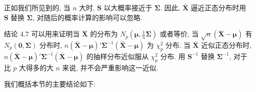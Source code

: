 正如我们所见到的, 当 $n$ 大时, $\mathbf{S}$ 以大概率接近于 $\boldsymbol{\Sigma}$. 因此, $\bar{\mathbf{X}}$ 逼近正态分布时用 $\mathbf{S}$ 替换 $\boldsymbol{\Sigma}$, 对随后的概率计算的影响可以忽略.

结论 4.7 可以用来证明当 $\bar{\mathbf{X}}$ 的分布为 $N_{p}\left(\boldsymbol{\mu},\frac{1}{n}\boldsymbol{\Sigma}\right)$ 或者等价, 当 $\sqrt{n}(\bar{\mathbf{X}}-\boldsymbol{\mu})$ 有 $N_{p}(\mathbf{0},\boldsymbol{\Sigma})$ 分布时, $n(\bar{\mathbf{X}}-\boldsymbol{\mu})'\boldsymbol{\Sigma}^{-1}(\bar{\mathbf{X}}-\boldsymbol{\mu})$ 为 $\chi_{p}^{2}$ 分布. 当 $\bar{\mathbf{X}}$ 近似正态分布时, $n(\bar{\mathbf{X}}-\boldsymbol{\mu})'\boldsymbol{\Sigma}^{-1}(\bar{\mathbf{X}}-\boldsymbol{\mu})$ 的抽样分布近似服从 $\chi_{p}^{2}$ 分布. 用 $\mathbf{S}^{-1}$ 替换 $\boldsymbol{\Sigma}^{-1}$, 对于比 $p$ 大得多的大 $n$ 来说, 并不会严重影响这一近似.

我们概括本节的主要结论如下:
